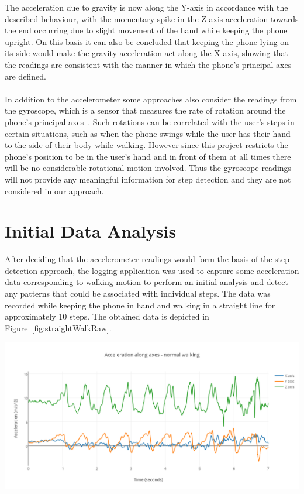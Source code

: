 \documentclass[12pt,a4paper,notitlepage]{report}
\begin{document}
The acceleration due to gravity is now along the Y-axis in accordance with the described behaviour, with the momentary spike in the Z-axis acceleration towards the end occurring due to slight movement of the hand while keeping the phone upright. On this basis it can also be concluded that keeping the phone lying on its side would make the gravity acceleration act along the X-axis, showing that the readings are consistent with the manner in which the phone's principal axes are defined. 
\\
\\
In addition to the accelerometer some approaches also consider the readings from the gyroscope, which is a sensor that measures the rate of rotation around the phone's principal axes~\cite{accelerometerAcceleration}. Such rotations can be correlated with the user's steps in certain situations, such as when the phone swings while the user has their hand to the side of their body while walking. However since this project restricts the phone's position to be in the user's hand and in front of them at all times there will be no considerable rotational motion involved. Thus the gyroscope readings will not provide any meaningful information for step detection and they are not considered in our approach. 

\section*{Initial Data Analysis}

After deciding that the accelerometer readings would form the basis of the step detection approach, the logging application was used to capture some acceleration data corresponding to walking motion to perform an initial analysis and detect any patterns that could be associated with individual steps. The data was recorded while keeping the phone in hand and walking in a straight line for approximately 10 steps. 
The obtained data is depicted in Figure~\ref{fig:straightWalkRaw}. 

\begin{center}
\includegraphics[scale=0.9]{images/straightWalkRaw.png}
\label{fig:straightWalkRaw}
\end{center}
\end{document}
